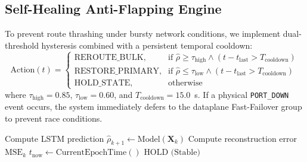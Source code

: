 \documentclass[conference]{IEEEtran}
\begin{document}
\subsection{Self-Healing Anti-Flapping Engine}
To prevent route thrashing under bursty network conditions, we implement dual-threshold hysteresis combined with a persistent temporal cooldown:
\begin{equation}
\text{Action}(t) = 
\begin{cases} 
\text{REROUTE\_BULK}, & \text{if } \hat{\rho} \ge \tau_{\text{high}} \land (t - t_{\text{last}} > T_{\text{cooldown}}) \\
\text{RESTORE\_PRIMARY}, & \text{if } \hat{\rho} \le \tau_{\text{low}} \land (t - t_{\text{last}} > T_{\text{cooldown}}) \\
\text{HOLD\_STATE}, & \text{otherwise}
\end{cases}
\end{equation}
where $\tau_{\text{high}} = 0.85$, $\tau_{\text{low}} = 0.60$, and $T_{\text{cooldown}} = 15.0$~s. If a physical \texttt{PORT\_DOWN} event occurs, the system immediately defers to the dataplane Fast-Failover group to prevent race conditions.

\begin{algorithm}[htbp]
\caption{Proactive AI-Driven Self-Healing Algorithm}
\label{alg:self_healing}
\BlankLine
{}
Compute LSTM prediction $\hat{\rho}_{k+1} \leftarrow \text{Model}(\mathbf{X}_k)$\;
Compute reconstruction error $\text{MSE}_k$\;
$t_{\text{now}} \leftarrow \text{CurrentEpochTime}()$\;
\BlankLine
{}
\BlankLine
{}
\Return $\text{HOLD (Stable)}$\;
\end{algorithm}
\end{document}

